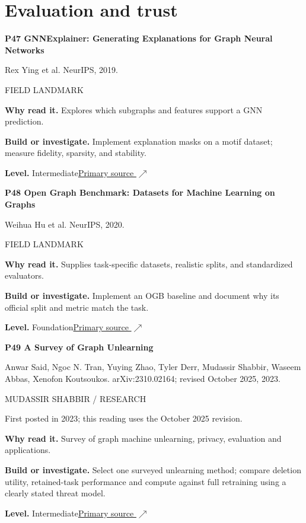 \documentclass[11pt,letterpaper]{article}
\begin{document}
\section*{Evaluation and trust}
\begin{minipage}{\linewidth}
{\large\bfseries P47 GNNExplainer: Generating Explanations for Graph Neural Networks}\par
Rex Ying et al. NeurIPS, 2019.\par
\textcolor{ink}{\small FIELD LANDMARK}\par
\textbf{Why read it.} Explores which subgraphs and features support a GNN prediction.\par
\textbf{Build or investigate.} Implement explanation masks on a motif dataset; measure fidelity, sparsity, and stability.\par
\textbf{Level.} Intermediate\quad\href{https://arxiv.org/abs/1903.03894}{Primary source $\nearrow$}\par
\end{minipage}\par\vspace{10pt}
\begin{minipage}{\linewidth}
{\large\bfseries P48 Open Graph Benchmark: Datasets for Machine Learning on Graphs}\par
Weihua Hu et al. NeurIPS, 2020.\par
\textcolor{ink}{\small FIELD LANDMARK}\par
\textbf{Why read it.} Supplies task-specific datasets, realistic splits, and standardized evaluators.\par
\textbf{Build or investigate.} Implement an OGB baseline and document why its official split and metric match the task.\par
\textbf{Level.} Foundation\quad\href{https://arxiv.org/abs/2005.00687}{Primary source $\nearrow$}\par
\end{minipage}\par\vspace{10pt}
\begin{minipage}{\linewidth}
{\large\bfseries P49 A Survey of Graph Unlearning}\par
Anwar Said, Ngoc N. Tran, Yuying Zhao, Tyler Derr, Mudassir Shabbir, Waseem Abbas, Xenofon Koutsoukos. arXiv:2310.02164; revised October 2025, 2023.\par
\textcolor{ink}{\small MUDASSIR SHABBIR / RESEARCH}\par
{\small First posted in 2023; this reading uses the October 2025 revision.}\par
\textbf{Why read it.} Survey of graph machine unlearning, privacy, evaluation and applications.\par
\textbf{Build or investigate.} Select one surveyed unlearning method; compare deletion utility, retained-task performance and compute against full retraining using a clearly stated threat model.\par
\textbf{Level.} Intermediate\quad\href{https://arxiv.org/abs/2310.02164}{Primary source $\nearrow$}\par
\end{minipage}\par\vspace{10pt}
\end{document}
